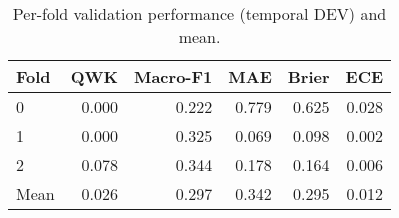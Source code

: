 \begin{table}
\caption{Per-fold validation performance (temporal DEV) and mean.}
\label{tab:cv-performance}
\begin{tabular}{lrrrrr}
\toprule
Fold & QWK & Macro-F1 & MAE & Brier & ECE \\
\midrule
0 & 0.000 & 0.222 & 0.779 & 0.625 & 0.028 \\
1 & 0.000 & 0.325 & 0.069 & 0.098 & 0.002 \\
2 & 0.078 & 0.344 & 0.178 & 0.164 & 0.006 \\
Mean & 0.026 & 0.297 & 0.342 & 0.295 & 0.012 \\
\bottomrule
\end{tabular}
\end{table}
